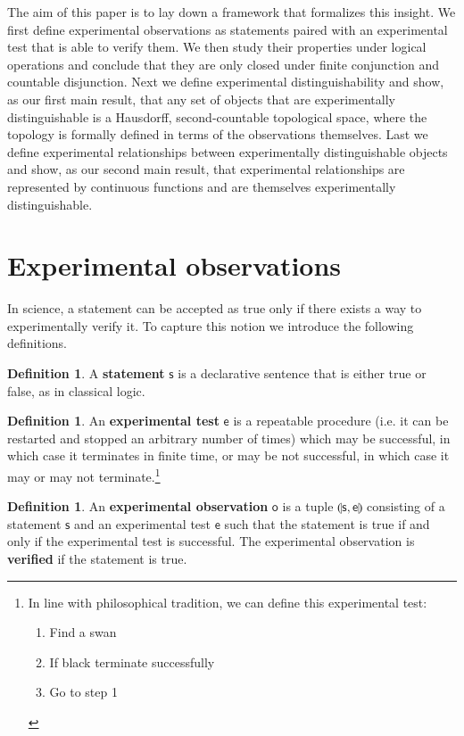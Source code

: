\documentclass{amsart}
\theoremstyle{definition}
\newtheorem{defn}[thm]{Definition}
\numberwithin{equation}{section}
\begin{document}
The aim of this paper is to lay down a framework that formalizes this insight. We first define experimental observations as statements paired with an experimental test that is able to verify them. We then study their properties under logical operations and conclude that they are only closed under finite conjunction and countable disjunction. Next we define experimental distinguishability and show, as our first main result, that any set of objects that are experimentally distinguishable is a Hausdorff, second-countable topological space, where the topology is formally defined in terms of the observations themselves. Last we define experimental relationships between experimentally distinguishable objects and show, as our second main result, that experimental relationships are represented by continuous functions and are themselves experimentally distinguishable.


\section{\bf Experimental observations}

In science, a statement can be accepted as true only if there exists a way to experimentally verify it. To capture this notion we introduce the following definitions.

\begin{defn}
	A \textbf{statement} $\mathsf{s}$ is a declarative sentence that is either true or false, as in classical logic. 
\end{defn}

\begin{defn}
	An \textbf{experimental test} $\mathsf{e}$ is a repeatable procedure (i.e. it can be restarted and stopped an arbitrary number of times) which may be successful, in which case it terminates in finite time, or may be not successful, in which case it may or may not terminate.\footnote{In line with philosophical tradition\cite{mill,russell}, we can define this experimental test:
		\begin{enumerate}
			\item Find a swan
			\item If black terminate successfully
			\item Go to step 1
	\end{enumerate}}
\end{defn}

\begin{defn}
	An \textbf{experimental observation} $\mathsf{o}$ is a tuple $\llparenthesis \mathsf{s}, \mathsf{e} \rrparenthesis$ consisting of a statement $\mathsf{s}$ and an experimental test $\mathsf{e}$ such that the statement is true if and only if the  experimental test is successful. The experimental observation is \textbf{verified} if the statement is true.
\end{defn}
\end{document}
